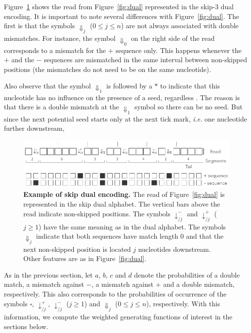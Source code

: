\documentclass{article}
\begin{document}
Figure~\ref{fig:skip_dual} shows the read from Figure~\ref{fig:dual}
represented in the skip-3 dual encoding. It is important to note several
differences with Figure~\ref{fig:dual}. The first is that the symbols
$\Downarrow_j$ ($0 \leq j \leq n$) are not always associated with double
mismatches. For instance, the symbol $\Downarrow_0$ on the right side of
the read corresponds to a mismatch for the $+$ sequence only. This happens
whenever the $+$ and the $-$ sequences are mismatched in the same interval
between non-skipped positions (the mismatches do not need to be on the
same nucleotide).

Also observe that the symbol $\Downarrow_1$ is followed by a $*$ to
indicate that this nucleotide has no influence on the presence of a seed,
regardless 
. The reason is that there
is a double mismatch at the $\Downarrow_1$ symbol so there can be no seed.
But since the next potential seed starts only at the next tick mark,
\textit{i.e.} one nucleotide further downstream, 

\begin{figure}[h]
\centering
\includegraphics[scale=0.85]{sketch_skip_dual.pdf}
\caption{\textbf{Example of skip dual encoding.}
The read of Figure~\ref{fig:dual} is represented in the skip dual alphabet.
The vertical bars above the read indicate non-skipped positions. The
symbols $\downarrow_{/j}^-$ and $\downarrow_{/j}^+$ ($j \geq 1$) have the
same meaning as in the dual alphabet. The symbols $\Downarrow_j$ indicate
that both sequences have match length 0 and that the next non-skipped
position is located $j$ nucleotides downstream. Other features are as in
Figure~\ref{fig:dual}.}
\label{fig:skip_dual}
\end{figure}

As in the previous section, let $a$, $b$, $c$ and $d$ denote the
probabilities of a double match, a mismatch against $-$, a mismatch
against $+$ and a double mismatch, respectively. This also corresponds to
the probabilities of occurrence of the symbols $\square$,
$\downarrow_{/j}^+$, $\downarrow_{/j}^-$ ($j \geq 1$) and $\Downarrow_j$
($0 \leq j \leq n$), respectively. With this information, we compute the
weighted generating functions of interest in the sections below.
\end{document}
